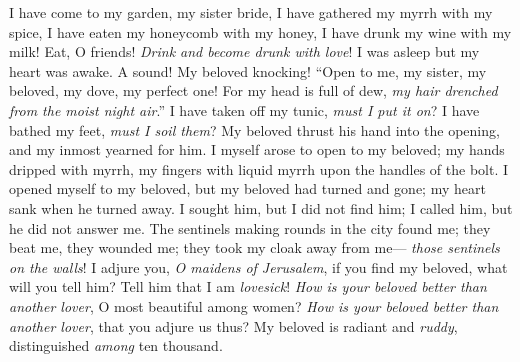 \begin{biblechapter} %
\verse I have come to my garden, my sister bride, 
I have gathered my myrrh with my spice, 
I have eaten my honeycomb with my honey, 
I have drunk my wine with my milk! 
Eat, O friends! \textit{Drink and become drunk with love}!
 I was asleep but my heart was awake. 
A sound! My beloved knocking! 
“Open to me, my sister, my beloved, 
my dove, my perfect one! 
For my head is full of dew, 
\textit{my hair drenched from the moist night air}.”
\verse I have taken off my tunic, \textit{must I put it on}? 
I have bathed my feet, \textit{must I soil them}?
\verse My beloved thrust his hand into the opening, 
and my inmost yearned for him.
\verse I myself arose to open to my beloved; 
my hands dripped with myrrh, 
my fingers with liquid myrrh 
upon the handles of the bolt.
\verse I opened myself to my beloved, 
but my beloved had turned and gone; 
my heart sank when he turned away. 
I sought him, but I did not find him; 
I called him, but he did not answer me.
\verse The sentinels making rounds in the city found me; 
they beat me, they wounded me; 
they took my cloak away from me— 
\textit{those sentinels on the walls}!
 I adjure you, \textit{O maidens of Jerusalem}, 
if you find my beloved, what will you tell him? 
Tell him that I am \textit{lovesick}!
 \textit{How is your beloved better than another lover}, 
O most beautiful among women? 
\textit{How is your beloved better than another lover},  
that you adjure us thus?
\verse My beloved is radiant and \textit{ruddy}, 
distinguished \textit{among} ten thousand.

\end{biblechapter}
